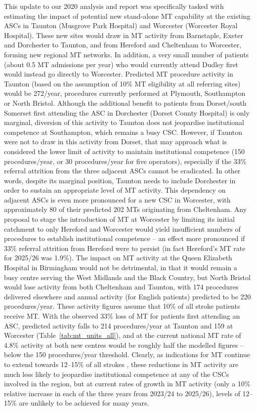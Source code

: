 This update to our 2020 analysis and report was specifically tasked with estimating the impact of potential new stand-alone MT capability at the existing ASCs in Taunton (Musgrove Park Hospital) and Worcester (Worcester Royal Hospital). These new sites would draw in MT activity from Barnstaple, Exeter and Dorchester to Taunton, and from Hereford and Cheltenham to Worcester, forming new regional MT networks. In addition, a very small number of patients (about 0.5 MT admissions per year) who would currently attend Dudley first would instead go directly to Worcester. Predicted MT procedure activity in Taunton (based on the assumption of 10\% MT eligibility at all referring sites) would be 272/year, procedures currently performed at Plymouth, Southampton or North Bristol. Although the additional benefit to patients from Dorset/south Somerset first attending the ASC in Dorchester (Dorset County Hospital) is only marginal, diversion of this activity to Taunton does not jeopardise institutional competence at Southampton, which remains a busy CSC. However, if Taunton were not to draw in this activity from Dorset, that may approach what is considered the lower limit of activity to maintain institutional competence (150 procedures/year, or 30 procedures/year for five operators), especially if the 33\% referral attrition from the three adjacent ASCs cannot be eradicated. In other words, despite its marginal position, Taunton needs to include Dorchester in order to sustain an appropriate level of MT activity. This dependency on adjacent ASCs is even more pronounced for a new CSC in Worcester, with approximately 80 of their predicted 202 MTs originating from Cheltenham. Any proposal to stage the introduction of MT at Worcester by limiting its initial catchment to only Hereford and Worcester would yield insufficient numbers of procedures to establish institutional competence -- an effect more pronounced if 33\% referral attrition from Hereford were to persist (in fact Hereford's MT rate for 2025/26 was 1.9\%). The impact on MT activity at the Queen Elizabeth Hospital in Birmingham would not be detrimental, in that it would remain a busy centre serving the West Midlands and the Black Country, but North Bristol would lose activity from both Cheltenham and Taunton, with 174 procedures delivered elsewhere and annual activity (for English patients) predicted to be 220 procedures/year. These activity figures assume that 10\% of all stroke patients receive MT. With the observed 33\% loss of MT for patients first attending an ASC, predicted activity falls to 214 procedures/year at Taunton and 159 at Worcester (Table~\ref{tab:mt_units_all}), and at the current national MT rate of 4.8\% activity at both new centres would be roughly half the modelled figures -- below the 150 procedures/year threshold. Clearly, as indications for MT continue to extend towards 12--15\% of all strokes \cite{mcmeekin2024}, these reductions in MT activity are much less likely to jeopardise institutional competence at any of the CSCs involved in the region, but at current rates of growth in MT activity (only a 10\% relative increase in each of the three years from 2023/24 to 2025/26), levels of 12--15\% are unlikely to be achieved for many years.

